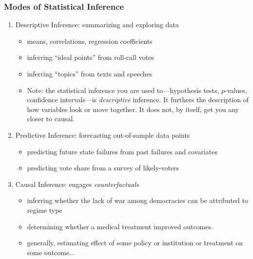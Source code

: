 \documentclass[xcolor=dvipsnames]{beamer}
\begin{document}
\begin{frame}
\frametitle{Modes of Statistical Inference}
  \begin{enumerate}
  \item[1.] Descriptive Inference: summarizing and exploring data
    \begin{itemize}
    \item means, correlations, regression coefficients
    \item inferring ``ideal points'' from roll-call votes
    \item inferring ``topics'' from texts and speeches
    \item Note: the statistical inference you are used to---hypothesis tests, $p$-values, confidence intervals---is \textit{descriptive} inference. It furthers the description of how variables look or move together. It does not, by itself, get you any closer to causal.
    \end{itemize}
    \medskip \pause
  \item[2.] Predictive Inference: forecasting out-of-sample data
    points
    \begin{itemize}
    \item predicting future state failures from past failures and covariates
    \item predicting vote share from a survey of likely-voters
   \end{itemize}

    \medskip \pause
  \item[3.] \alert{Causal Inference}: engages {\it counterfactuals}
    \begin{itemize}
    \item inferring whether the lack of war among democracies can be attributed to regime type
    \item determining whether a medical treatment improved outcomes.
    \item generally, estimating effect of some policy or institution or treatment on some outcome...
    \end{itemize}
  \end{enumerate}

\end{frame}
\end{document}
